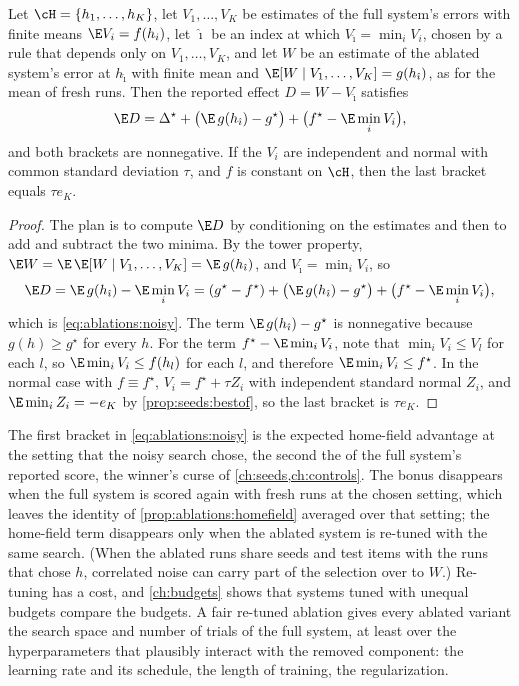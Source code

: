 \begin{refsection}
\begin{corollary}\label{cor:ablations:noisy}
Let $\cH=\{h_1,\dots,h_K\}$, let $V_1,\dots,V_K$ be estimates of the full system's errors with finite means $\E V_i=f(h_i)$, let $\hat\imath$ be an index at which $V_{\hat\imath}=\min_iV_i$, chosen by a rule that depends only on $V_1,\dots,V_K$, and let $W$ be an estimate of the ablated system's error at $h_{\hat\imath}$ with finite mean and $\E[W\mid V_1,\dots,V_K]=g(h_{\hat\imath})$, as for the mean of fresh runs. Then the reported effect $D=W-V_{\hat\imath}$ satisfies
\begin{equation}\label{eq:ablations:noisy}
\E D=\Delta^\star+\bigl(\E\,g(h_{\hat\imath})-g^\star\bigr)+\bigl(f^\star-\E\min_iV_i\bigr),
\end{equation}
and both brackets are nonnegative. If the $V_i$ are independent and normal with common standard deviation $\tau$, and $f$ is constant on $\cH$, then the last bracket equals $\tau e_K$.
\end{corollary}

\begin{proof}
The plan is to compute $\E D$ by conditioning on the estimates and then to add and subtract the two minima. By the tower property, $\E W=\E\,\E[W\mid V_1,\dots,V_K]=\E\,g(h_{\hat\imath})$, and $V_{\hat\imath}=\min_iV_i$, so
\[
\E D=\E\,g(h_{\hat\imath})-\E\min_iV_i=(g^\star-f^\star)+\bigl(\E\,g(h_{\hat\imath})-g^\star\bigr)+\bigl(f^\star-\E\min_iV_i\bigr),
\]
which is \eqref{eq:ablations:noisy}. The term $\E\,g(h_{\hat\imath})-g^\star$ is nonnegative because $g(h)\ge g^\star$ for every $h$. For the term $f^\star-\E\min_iV_i$, note that $\min_iV_i\le V_l$ for each $l$, so $\E\min_iV_i\le f(h_l)$ for each $l$, and therefore $\E\min_iV_i\le f^\star$. In the normal case with $f\equiv f^\star$, $V_i=f^\star+\tau Z_i$ with independent standard normal $Z_i$, and $\E\min_iZ_i=-e_K$ by \cref{prop:seeds:bestof}, so the last bracket is $\tau e_K$.
\end{proof}

The first bracket in \eqref{eq:ablations:noisy} is the expected home-field advantage at the setting that the noisy search chose, the second the  of the full system's reported score, the winner's curse of \cref{ch:seeds,ch:controls}. The bonus disappears when the full system is scored again with fresh runs at the chosen setting, which leaves the identity of \cref{prop:ablations:homefield} averaged over that setting; the home-field term disappears only when the ablated system is re-tuned with the same search. (When the ablated runs share seeds and test items with the runs that chose $h$, correlated noise can carry part of the selection over to $W$.) Re-tuning has a cost, and \cref{ch:budgets} shows that systems tuned with unequal budgets compare the budgets. A fair re-tuned ablation gives every ablated variant the search space and number of trials of the full system, at least over the hyperparameters that plausibly interact with the removed component: the learning rate and its schedule, the length of training, the regularization.


\end{refsection}
